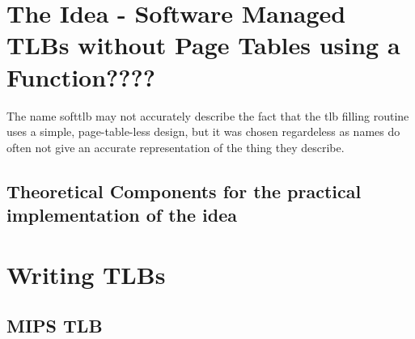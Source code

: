 


\section{The Idea - Software Managed TLBs without Page Tables using a Function????}
The name softtlb may not accurately describe the fact that the tlb filling routine uses a simple,
page-table-less design, but it was chosen regardeless as names do often not give an accurate
representation of the thing they describe.
\subsection{Theoretical Components for the practical implementation of the idea}





\section{Writing TLBs}
%

\subsection{MIPS TLB}

